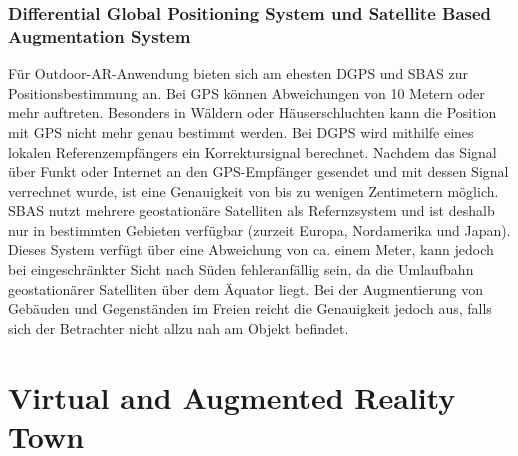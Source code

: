 \subsection*{Differential Global Positioning System und Satellite Based Augmentation System}
Für Outdoor-AR-Anwendung bieten sich am ehesten DGPS und SBAS zur Positionsbestimmung an. Bei GPS können Abweichungen von 10 Metern oder mehr auftreten. Besonders in Wäldern oder Häuserschluchten kann die Position mit GPS nicht mehr genau bestimmt werden. Bei DGPS wird mithilfe eines lokalen Referenzempfängers ein Korrektursignal berechnet. Nachdem das Signal über Funkt oder Internet an den GPS-Empfänger gesendet und mit dessen Signal verrechnet wurde, ist eine Genauigkeit von bis zu wenigen Zentimetern möglich.\\[6pt]
\newpage
SBAS nutzt mehrere geostationäre Satelliten als Refernzsystem und ist deshalb nur in bestimmten Gebieten verfügbar (zurzeit Europa, Nordamerika und Japan). Dieses System verfügt über eine Abweichung von ca. einem Meter, kann jedoch bei eingeschränkter Sicht nach Süden fehleranfällig sein, da die Umlaufbahn geostationärer Satelliten über dem Äquator liegt. Bei der Augmentierung von Gebäuden und Gegenständen im Freien reicht die Genauigkeit jedoch aus, falls sich der Betrachter nicht allzu nah am Objekt befindet.\cite[S.~253~ff.]{doerner13}

\chapter{Virtual and Augmented Reality Town}\label{c.towndemo}
\vspace{-20pt}
